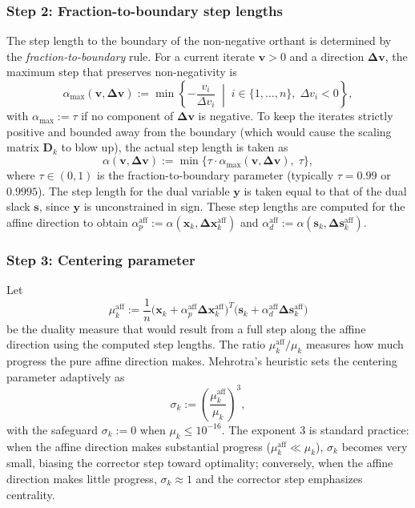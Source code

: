 \documentclass[11pt,twoside]{article}
\newcommand{\bx}{\mathbf{x}}
\newcommand{\by}{\mathbf{y}}
\newcommand{\bs}{\mathbf{s}}
\newcommand{\bD}{\mathbf{D}}
\newcommand{\bv}{\mathbf{v}}
\newcommand{\bDelta}{\mathbf{\Delta}}
\begin{document}
\subsubsection{Step 2: Fraction-to-boundary step lengths}

The step length to the boundary of the non-negative orthant is determined
by the \emph{fraction-to-boundary} rule.  For a current iterate $\bv > 0$
and a direction $\bDelta\bv$, the maximum step that preserves
non-negativity is
\begin{equation}
  \alpha_{\max}(\bv, \bDelta\bv) :=
    \min\left\{
      -\frac{v_i}{\Delta v_i}
      \;\middle|\;
      i \in \{1,\dots,n\},\; \Delta v_i < 0
    \right\},
  \label{eq:alpha-max}
\end{equation}
with $\alpha_{\max} := \tau$ if no component of $\bDelta\bv$ is negative.
To keep the iterates strictly positive and bounded away from the boundary
(which would cause the scaling matrix $\bD_k$ to blow up), the actual step
length is taken as
\begin{equation}
  \boxed{\alpha(\bv, \bDelta\bv) :=
    \min\bigl\{\tau \cdot \alpha_{\max}(\bv, \bDelta\bv),\; \tau\bigr\}},
  \label{eq:step-length}
\end{equation}
where $\tau \in (0,1)$ is the fraction-to-boundary parameter (typically
$\tau = 0.99$ or $0.9995$).  The step length for the dual variable $\by$
is taken equal to that of the dual slack $\bs$, since $\by$ is
unconstrained in sign.  These step lengths are computed for the affine
direction to obtain $\alpha_p^{\text{aff}} :=
\alpha(\bx_k, \bDelta\bx_k^{\text{aff}})$ and $\alpha_d^{\text{aff}} :=
\alpha(\bs_k, \bDelta\bs_k^{\text{aff}})$.

\subsubsection{Step 3: Centering parameter}

Let
\begin{equation}
  \mu_k^{\text{aff}} :=
    \frac{1}{n}
      \bigl(\bx_k + \alpha_p^{\text{aff}}\bDelta\bx_k^{\text{aff}}\bigr)^T
      \bigl(\bs_k + \alpha_d^{\text{aff}}\bDelta\bs_k^{\text{aff}}\bigr)
  \label{eq:mu-aff}
\end{equation}
be the duality measure that would result from a full step along the affine
direction using the computed step lengths.  The ratio $\mu_k^{\text{aff}}
/ \mu_k$ measures how much progress the pure affine direction makes.
Mehrotra's heuristic sets the centering parameter adaptively as
\begin{equation}
  \boxed{\sigma_k := \left(\frac{\mu_k^{\text{aff}}}{\mu_k}\right)^3},
  \label{eq:sigma}
\end{equation}
with the safeguard $\sigma_k := 0$ when $\mu_k \le 10^{-16}$.  The
exponent $3$ is standard practice: when the affine direction makes
substantial progress ($\mu_k^{\text{aff}} \ll \mu_k$), $\sigma_k$ becomes
very small, biasing the corrector step toward optimality; conversely,
when the affine direction makes little progress, $\sigma_k \approx 1$ and
the corrector step emphasizes centrality.
\end{document}
